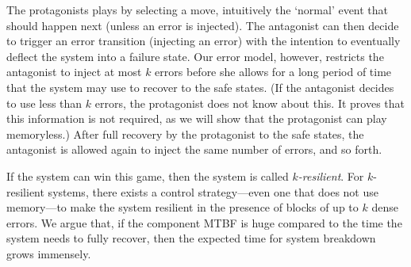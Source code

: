 The protagonists plays by selecting a move, intuitively the `normal' event that should happen next (unless an error is injected).
The antagonist can then decide to trigger 
an error transition (injecting an error) with the intention to
eventually deflect the system into a failure state. 
Our error model, however, restricts 
the antagonist to inject at most $k$ errors before she allows for a long period of time that the system may use to recover to the safe states.
(If the antagonist decides to use less than $k$ errors, the protagonist does not know about this.
It proves that this information is not required, as we will show
\label{reply1.memoryless.future} that the protagonist can play memoryless.)
After full recovery by the protagonist to the safe states, the antagonist is allowed again 
to inject the same number of errors, and so forth.
  
If the system can win this game, then the system is called {\em $k$-resilient}.
For $k$-resilient systems, there exists a control strategy---even one that does not use memory---to make the system 
resilient in the presence of blocks of up to $k$ dense errors. 
We argue that, if the component MTBF is huge compared to the time the system needs to fully recover, then the expected time for system breakdown grows immensely.  

